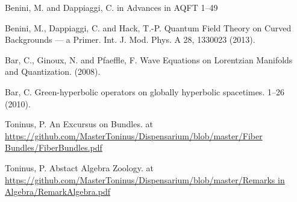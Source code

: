 \documentclass[a4paper,12pt]{scrartcl}    %
\begin{document}
		
\newpage
\begin{thebibliography}{100}

 Benini, M. and Dappiaggi, C. in Advances in AQFT 1–49

 Benini, M., Dappiaggi, C. and Hack, T.-P. Quantum Field Theory on Curved Backgrounds — a Primer. Int. J. Mod. Phys. A 28, 1330023 (2013).

 Bar, C., Ginoux, N. and Pfaeffle, F. Wave Equations on Lorentzian Manifolds and Quantization. (2008).

  Bar, C. Green-hyperbolic operators on globally hyperbolic spacetimes. 1–26 (2010).


  Toninus, P. An Excursus on Bundles. at \url{https://github.com/MasterToninus/Dispensarium/blob/master/Fiber Bundles/FiberBundles.pdf}

 Toninus, P. Abstact Algebra Zoology. at \url{https://github.com/MasterToninus/Dispensarium/blob/master/Remarks in Algebra/RemarkAlgebra.pdf}

\end{thebibliography}		
\end{document}
